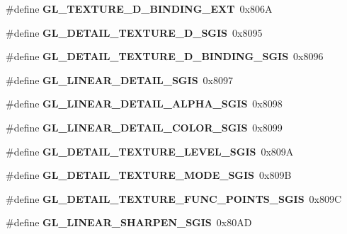 \begin{DoxyCompactItemize}
\item 
\#define {\bfseries G\+L\+\_\+\+T\+E\+X\+T\+U\+R\+E\+\_\+D\+\_\+\+B\+I\+N\+D\+I\+N\+G\+\_\+\+E\+X\+T}~0x806\+A\label{_s_d_l__opengl_8h_afa4425bccef49dcb22972da33d0464cf}

\item 
\#define {\bfseries G\+L\+\_\+\+D\+E\+T\+A\+I\+L\+\_\+\+T\+E\+X\+T\+U\+R\+E\+\_\+D\+\_\+\+S\+G\+I\+S}~0x8095\label{_s_d_l__opengl_8h_ae859b11489157f82c82a772440caa653}

\item 
\#define {\bfseries G\+L\+\_\+\+D\+E\+T\+A\+I\+L\+\_\+\+T\+E\+X\+T\+U\+R\+E\+\_\+D\+\_\+\+B\+I\+N\+D\+I\+N\+G\+\_\+\+S\+G\+I\+S}~0x8096\label{_s_d_l__opengl_8h_a2fe42d2ca06d900253e7a94b77707b38}

\item 
\#define {\bfseries G\+L\+\_\+\+L\+I\+N\+E\+A\+R\+\_\+\+D\+E\+T\+A\+I\+L\+\_\+\+S\+G\+I\+S}~0x8097\label{_s_d_l__opengl_8h_a91e936592eef5bb73a05f0e9639a7ef2}

\item 
\#define {\bfseries G\+L\+\_\+\+L\+I\+N\+E\+A\+R\+\_\+\+D\+E\+T\+A\+I\+L\+\_\+\+A\+L\+P\+H\+A\+\_\+\+S\+G\+I\+S}~0x8098\label{_s_d_l__opengl_8h_a63907e9da6b787f8100990a6b6d10739}

\item 
\#define {\bfseries G\+L\+\_\+\+L\+I\+N\+E\+A\+R\+\_\+\+D\+E\+T\+A\+I\+L\+\_\+\+C\+O\+L\+O\+R\+\_\+\+S\+G\+I\+S}~0x8099\label{_s_d_l__opengl_8h_a8e92b3432f9b7fb79c1eaa531fe8dcc0}

\item 
\#define {\bfseries G\+L\+\_\+\+D\+E\+T\+A\+I\+L\+\_\+\+T\+E\+X\+T\+U\+R\+E\+\_\+\+L\+E\+V\+E\+L\+\_\+\+S\+G\+I\+S}~0x809\+A\label{_s_d_l__opengl_8h_ae8d58b5778eaf1643b16ae03db3b38f4}

\item 
\#define {\bfseries G\+L\+\_\+\+D\+E\+T\+A\+I\+L\+\_\+\+T\+E\+X\+T\+U\+R\+E\+\_\+\+M\+O\+D\+E\+\_\+\+S\+G\+I\+S}~0x809\+B\label{_s_d_l__opengl_8h_a33af6435800206a273499f9a23626191}

\item 
\#define {\bfseries G\+L\+\_\+\+D\+E\+T\+A\+I\+L\+\_\+\+T\+E\+X\+T\+U\+R\+E\+\_\+\+F\+U\+N\+C\+\_\+\+P\+O\+I\+N\+T\+S\+\_\+\+S\+G\+I\+S}~0x809\+C\label{_s_d_l__opengl_8h_a78f576460462f7fb616cd0ae0585ee5d}

\item 
\#define {\bfseries G\+L\+\_\+\+L\+I\+N\+E\+A\+R\+\_\+\+S\+H\+A\+R\+P\+E\+N\+\_\+\+S\+G\+I\+S}~0x80\+A\+D\label{_s_d_l__opengl_8h_a511a227d3c7699c49fa89c2d1fa63df2}


\end{DoxyCompactItemize}
